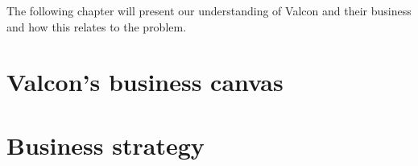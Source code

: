 The following chapter will present our understanding of Valcon and their business and how this relates to the problem.

\section{Valcon's business canvas}

\section{Business strategy}

